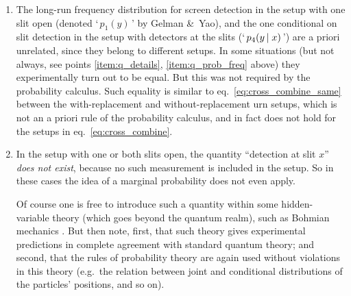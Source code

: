 \documentclass[\ifafour a4paper,12pt,\else a5paper,10pt,\fi%
onecolumn,oneside,article,%
british%
]{memoir}
\newcommand*{\defquote}[1]{`\,#1\,'}
\theoremstyle{remark}
\theoremstyle{innote}
\newcommand*{\ibid}{\unspace\addtocounter{footnote}{-1}\footnotemark{}}
\newcommand*{\amp}{\&}
\renewcommand*{\|}[1][]{\nonscript\,#1\vert\nonscript\;\mathopen{}}
\newcommand*{\eqn}{eq.}%
\newcommand*{\eg}{{e.g.}}
\begin{document}
\begin{enumerate}[label=(\roman*)]
\item\label{item:q_slitclosed_vs_detect} The long-run frequency
  distribution for screen detection in the setup with one slit open
  (denoted \defquote{$p_1(y)$} by Gelman \amp\ Yao), and the one
  conditional on slit detection in the setup with detectors at the slits
  (\defquote{$p_{4}(y \| x)$}) are a priori unrelated, since they belong to
  different setups. In some situations (but not always, see points
  \ref{item:q_details}, \ref{item:q_prob_freq} above) they experimentally
  turn out to be equal. But this was not required by the probability
  calculus. Such equality is similar to \eqn~\eqref{eq:cross_combine_same}
  between the with-replacement and without-replacement urn setups, which is
  not an a priori rule of the probability calculus, and in fact does not
  hold for the setups in \eqn~\eqref{eq:cross_combine}.

\item In the setup with one or both slits open, the quantity
  \enquote{detection at slit $x$} \emph{does not exist}, because no such
  measurement is included in the setup. So in these cases the idea of a
  marginal probability does not even apply.

  Of course one is free to introduce such a quantity within some
  hidden-variable theory (which goes beyond the quantum realm), such as
  Bohmian mechanics \parencite[\!; this theory includes as hidden variables
  the positions of the particles and the spatial configuration of a
  so-called pilot wave]{berndletal1995,duerretal2004,valentinietal2005}.
  But then note, first, that such theory gives experimental predictions in
  complete agreement with standard quantum theory; and second, that the
  rules of probability theory are again used without violations in this
  theory (\eg\ the relation between joint and conditional distributions of
  the particles' positions, and so on).
%
\end{enumerate}
\end{document}
